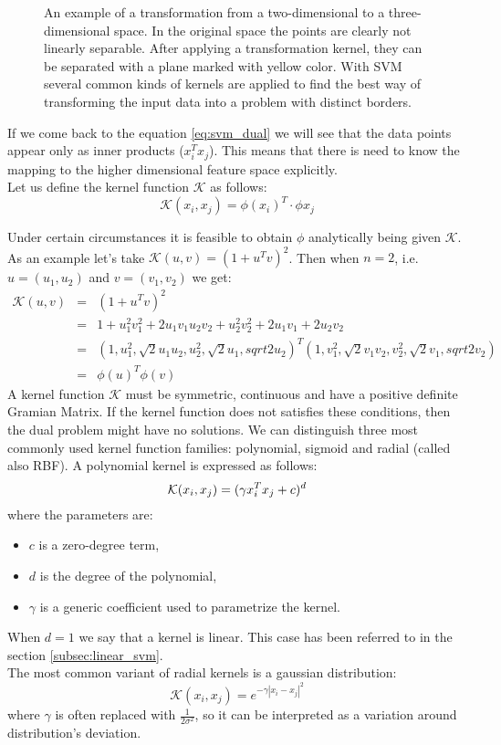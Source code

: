 \begin{figure}[htbp]
  \centering
  
  \caption{An example of a transformation from a two-dimensional to a three-dimensional space. In the original space the points are clearly not linearly separable. After applying a transformation kernel, they can be separated with a plane marked with yellow color. With SVM several common kinds of kernels are applied to find the best way of transforming the input data into a problem with distinct borders. }
  \label{fig:2dto3d}
\end{figure}

If we come back to the equation \ref{eq:svm_dual} we will see that the data points appear only as inner products ($x_i^Tx_j$). This means that there is need to know the mapping to the higher dimensional feature space explicitly. \\
Let us define the kernel function $\mathcal{K}$ as follows:
\begin{equation}
\mathcal{K}(x_i, x_j) = \phi(x_i)^T \cdot \phi{x_j}
\end{equation}

Under certain circumstances it is feasible to obtain $\phi$ analytically being given $\mathcal{K}$. As an example let's take $\mathcal{K}(u, v) = (1+u^Tv)^2$. Then when $n=2$, i.e. $u=(u_1,u_2)$ and $v=(v_1, v_2)$ we get:
\begin{align*}
\mathcal{K}(u, v) & = & (1+u^Tv)^2 \\
& = & 1 + u_1^2v_1^2+2u_1v_1u_2v_2+u_2^2v_2^2+2u_1v_1+2u_2v_2 \\
& = & (1, u_1^2, \sqrt{2}u_1u_2, u_2^2, \sqrt{2}u_1, sqrt{2}u_2)^T(1, v_1^2, \sqrt{2}v_1v_2, v_2^2, \sqrt{2}v_1, sqrt{2}v_2) \\
& = & \phi(u)^T\phi(v)
\end{align*}
A kernel function $\mathcal{K}$ must be symmetric, continuous and have a positive definite Gramian Matrix. If the kernel function does not satisfies these conditions, then the dual problem might have no solutions.
We can distinguish three most commonly used kernel function families: polynomial, sigmoid and radial (called also RBF).
A polynomial kernel is expressed as follows:
\begin{equation}
\mathcal{K}(x_i, x_j) = (\gamma x_i^Tx_j + c)^d \\
\end{equation}
where the parameters are:
\begin{itemize}
\item $c$ is a zero-degree term,
\item $d$ is the degree of the polynomial,
\item $\gamma$ is a generic coefficient used to parametrize the kernel.
\end{itemize}
When $d=1$ we say that a kernel is linear. This case has been referred to in the section \ref{subsec:linear_svm}.
\\
The most common variant of radial kernels is a gaussian distribution:
\begin{equation}
\mathcal{K}(x_i, x_j) = e^{-\gamma|x_i-x_j|^2}
\end{equation}
where $\gamma$ is often replaced with $\frac{1}{2\sigma^2}$, so it can be interpreted as a variation around distribution's deviation.
